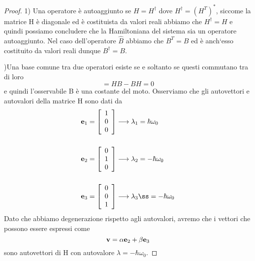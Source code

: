 \begin{proof}
	1) Una operatore \`e autoaggiunto se $H = H^\dag $ dove $H^\dag = (H^T)^*$, siccome la matrice H \`e diagonale ed \`e costituista da valori reali abbiamo che $H^\dag = H$ e quindi possiamo concludere che la Hamiltoniana del sistema sia un operatore autoaggiunto. Nel caso dell'operatore $\hat{B}$ abbiamo che $B^T = B$ ed \`e anch`esso costituito da valori reali dunque $B^\dag =B$.
	\newline
	
	)Una base comune tra due operatori esiste se e soltanto se questi commutano tra di loro
	\begin{equation*}
		[H,B] = HB -BH = 0
	\end{equation*}
	e quindi l'osservabile B \`e una costante del moto.
	Osserviamo che gli autovettori e autovalori della matrice H sono dati da
	\begin{align*}
	 &\bold{e}_{1} = \left [ \begin{array}{c}
	 	1 \\ 0 \\ 0
	 \end{array}\right] \longrightarrow \lambda_1 = \hbar\omega_0\\[0.5cm]
	  &\bold{e}_{2} = \left [ \begin{array}{c}
	 	0 \\ 1 \\ 0
	 \end{array}\right] \longrightarrow \lambda_2 = -\hbar\omega_0\\[0.5cm]
	  &\bold{e}_{3} = \left [ \begin{array}{c}
	 	0 \\ 0 \\ 1
	 \end{array}\right] \longrightarrow \lambda_3ß = -\hbar\omega_0
	\end{align*}
	Dato che abbiamo degenerazione rispetto agli autovalori, avremo che i vettori che possono essere espressi come
	\begin{equation*}
		\bold{v} = \alpha \bold{e}_2 + \beta \bold{e}_3
	\end{equation*}
	sono autovettori di H con autovalore $\lambda = -\hbar \omega_0$.
	

\end{proof}
